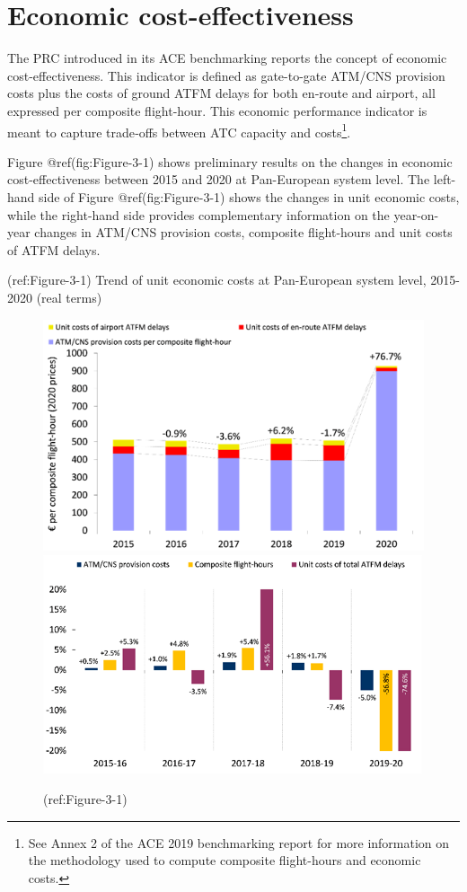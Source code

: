 \documentclass[
]{book}
\begin{document}
\hypertarget{economic}{%
\chapter{Economic cost-effectiveness}\label{economic}}

The PRC introduced in its ACE benchmarking reports the concept of
economic cost-effectiveness. This indicator is defined as gate-to-gate
ATM/CNS provision costs plus the costs of ground ATFM delays for both
en‐route and airport, all expressed per composite flight-hour. This
economic performance indicator is meant to capture trade‐offs between
ATC capacity and costs\footnote{See Annex 2 of the ACE 2019 benchmarking
  report for more information on the methodology used to compute
  composite flight-hours and economic costs.}.

Figure @ref(fig:Figure-3-1) shows preliminary results on the changes in
economic cost-effectiveness between 2015 and 2020 at Pan-European system
level. The left-hand side of Figure @ref(fig:Figure-3-1) shows the
changes in unit economic costs, while the right-hand side provides
complementary information on the year-on-year changes in ATM/CNS
provision costs, composite flight-hours and unit costs of ATFM delays.

(ref:Figure-3-1) Trend of unit economic costs at Pan-European system
level, 2015-2020 (real terms)

\begin{figure}

{\centering \includegraphics[width=0.5\linewidth]{figures/Figure-3-1-Left} \includegraphics[width=0.5\linewidth]{figures/Figure-3-1-Right} 

}

\caption{(ref:Figure-3-1)}\label{fig:Figure-3-1}
\end{figure}
\end{document}
